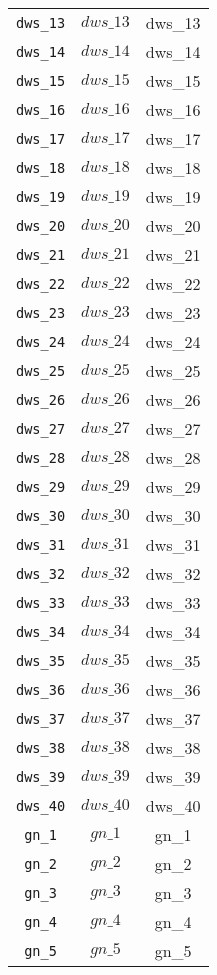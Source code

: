 \begin{center}
\begin{longtable}{ccc}
\texttt{dws\_13} & $dws\_13$ & dws\_13\\
\texttt{dws\_14} & $dws\_14$ & dws\_14\\
\texttt{dws\_15} & $dws\_15$ & dws\_15\\
\texttt{dws\_16} & $dws\_16$ & dws\_16\\
\texttt{dws\_17} & $dws\_17$ & dws\_17\\
\texttt{dws\_18} & $dws\_18$ & dws\_18\\
\texttt{dws\_19} & $dws\_19$ & dws\_19\\
\texttt{dws\_20} & $dws\_20$ & dws\_20\\
\texttt{dws\_21} & $dws\_21$ & dws\_21\\
\texttt{dws\_22} & $dws\_22$ & dws\_22\\
\texttt{dws\_23} & $dws\_23$ & dws\_23\\
\texttt{dws\_24} & $dws\_24$ & dws\_24\\
\texttt{dws\_25} & $dws\_25$ & dws\_25\\
\texttt{dws\_26} & $dws\_26$ & dws\_26\\
\texttt{dws\_27} & $dws\_27$ & dws\_27\\
\texttt{dws\_28} & $dws\_28$ & dws\_28\\
\texttt{dws\_29} & $dws\_29$ & dws\_29\\
\texttt{dws\_30} & $dws\_30$ & dws\_30\\
\texttt{dws\_31} & $dws\_31$ & dws\_31\\
\texttt{dws\_32} & $dws\_32$ & dws\_32\\
\texttt{dws\_33} & $dws\_33$ & dws\_33\\
\texttt{dws\_34} & $dws\_34$ & dws\_34\\
\texttt{dws\_35} & $dws\_35$ & dws\_35\\
\texttt{dws\_36} & $dws\_36$ & dws\_36\\
\texttt{dws\_37} & $dws\_37$ & dws\_37\\
\texttt{dws\_38} & $dws\_38$ & dws\_38\\
\texttt{dws\_39} & $dws\_39$ & dws\_39\\
\texttt{dws\_40} & $dws\_40$ & dws\_40\\
\texttt{gn\_1} & $gn\_1$ & gn\_1\\
\texttt{gn\_2} & $gn\_2$ & gn\_2\\
\texttt{gn\_3} & $gn\_3$ & gn\_3\\
\texttt{gn\_4} & $gn\_4$ & gn\_4\\
\texttt{gn\_5} & $gn\_5$ & gn\_5\\

\end{longtable}
\end{center}

